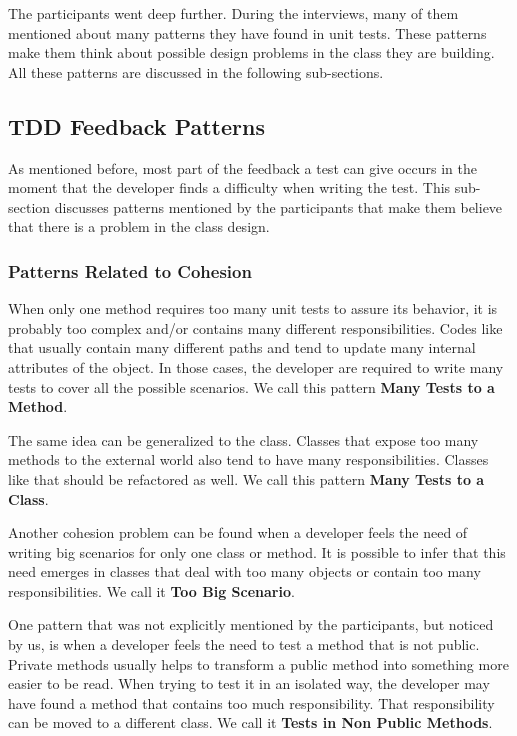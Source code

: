 \documentclass[conference]{IEEEtran}
\begin{document}
\begin{framed}
\begin{framed}
The participants went deep further. During the interviews, many of them
mentioned about many patterns they have found in unit tests. These patterns
make them think about possible design problems in the class they are building.
All these patterns are discussed in the following sub-sections.

\subsection{TDD Feedback Patterns}
\label{padroes-tdd}

As mentioned before, most part of the feedback a test can give occurs in the moment
that the developer finds a difficulty when writing the test. This sub-section discusses
patterns mentioned by the participants that make them believe that there is a
problem in the class design.

\subsubsection{Patterns Related to Cohesion}

When only one method requires too many unit tests to assure its behavior,
it is probably too complex and/or contains many different responsibilities.
Codes like that usually contain many different paths and tend to update
many internal attributes of the object. In those cases, the developer
are required to write many tests to cover all the possible scenarios.
We call this pattern \textbf{Many Tests to a Method}.

The same idea can be generalized to the class. Classes that expose too 
many methods to the external world also tend to have many responsibilities.
Classes like that should be refactored as well.
We call this pattern \textbf{Many Tests to a Class}.

Another cohesion problem can be found when a developer feels the need
of writing big scenarios for only one class or method. It is possible to infer
that this need emerges in classes that deal with too many objects or
contain too many responsibilities. We call it \textbf{Too Big Scenario}.

One pattern that was not explicitly mentioned by the participants, but
noticed by us, is when a developer feels the need to test a method
that is not public. Private methods usually helps to transform a public method
into something more easier to be read. When trying to test it in an isolated
way, the developer may have found a method that contains too much responsibility.
That responsibility can be moved to a different class. We call it \textbf{Tests in Non Public Methods}.


\end{framed}
\end{framed}
\end{document}
